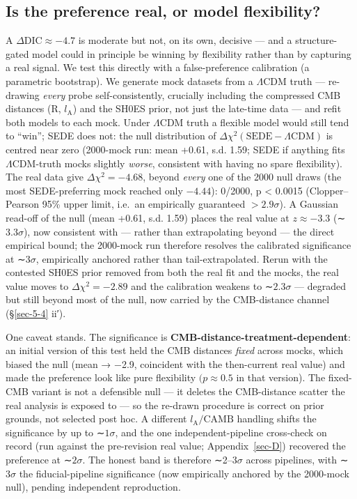 \documentclass[preprint,12pt]{elsarticle}
\begin{document}
\subsection{Is the preference real, or model
flexibility?}\label{sec-5-2}

A \(\Delta \mathrm{DIC} \approx  -4.7\) is moderate but not, on its own,
decisive --- and a structure-gated model could in principle be winning
by flexibility rather than by capturing a real signal. We test this
directly with a false-preference calibration (a parametric bootstrap).
We generate mock datasets from a \(\Lambda \mathrm{CDM}\) truth ---
re-drawing \emph{every} probe self-consistently, crucially including the
compressed CMB distances (R, \(l_{\mathrm{A}}\)) and the SH0ES prior,
not just the late-time data --- and refit both models to each mock.
Under \(\Lambda \mathrm{CDM}\) truth a flexible model would still tend
to ``win''; SEDE does not: the null distribution of
\(\Delta \chi ^{2}(\mathrm{SEDE} - \Lambda \mathrm{CDM})\) is centred
near zero (2000-mock run: mean +0.61, s.d. 1.59; SEDE if anything fits
\(\Lambda \mathrm{CDM}\)-truth mocks slightly \emph{worse}, consistent
with having no spare flexibility). The real data give
\(\Delta \chi ^{2} = -4.68\), beyond \emph{every} one of the 2000 null
draws (the most SEDE-preferring mock reached only \(-4.44\)): 0/2000, p
\textless{} 0.0015 (Clopper--Pearson 95\% upper limit, i.e.~an
empirically guaranteed \(> 2.9\sigma\)). A Gaussian read-off of the null
(mean +0.61, s.d. 1.59) places the real value at \(z \approx  -3.3\)
(∼\(3.3\sigma\)), now consistent with --- rather than extrapolating
beyond --- the direct empirical bound; the 2000-mock run therefore
resolves the calibrated significance at ∼\(3\sigma\), empirically
anchored rather than tail-extrapolated. Rerun with the contested SH0ES
prior removed from both the real fit and the mocks, the real value moves
to \(\Delta \chi ^{2} = -2.89\) and the calibration weakens to
∼\(2.3\sigma\) --- degraded but still beyond most of the null, now
carried by the CMB-distance channel (§\ref{sec-5-4} ii′).

One caveat stands. The significance is
\textbf{CMB-distance-treatment-dependent}: an initial version of this
test held the CMB distances \emph{fixed} across mocks, which biased the
null (mean → −2.9, coincident with the then-current real value) and made
the preference look like pure flexibility \((p \approx  0.5\) in that
version). The fixed-CMB variant is not a defensible null --- it deletes
the CMB-distance scatter the real analysis is exposed to --- so the
re-drawn procedure is correct on prior grounds, not selected post hoc. A
different \(l_{\mathrm{A}}/\mathrm{CAMB}\) handling shifts the
significance by up to ∼\(1\sigma\), and the one independent-pipeline
cross-check on record (run against the pre-revision real value;
Appendix~\ref{sec-D}) recovered the preference at ∼\(2\sigma\). The
honest band is therefore ∼2--\(3\sigma\) across pipelines, with
∼\(3\sigma\) the fiducial-pipeline significance (now empirically
anchored by the 2000-mock null), pending independent reproduction.
\end{document}
